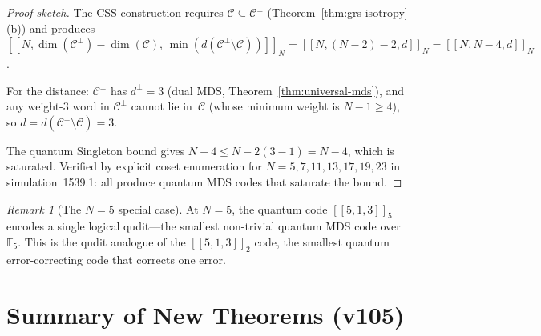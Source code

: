 \documentclass[aps,prd,twocolumn,superscriptaddress,floatfix,nofootinbib]{revtex4-2}
\theoremstyle{definition}
\theoremstyle{remark}
\newtheorem{remark}[theorem]{Remark}
\begin{document}
\begin{proof}[Proof sketch]
The CSS construction requires $\mathcal{C} \subseteq \mathcal{C}^{\perp}$
(Theorem~\ref{thm:grs-isotropy}(b)) and produces
$[\![N, \dim(\mathcal{C}^{\perp}) - \dim(\mathcal{C}),\,
\min(d(\mathcal{C}^{\perp}\setminus\mathcal{C}))]\!]_N
= [\![N, (N\!-\!2) - 2, d]\!]_N = [\![N, N\!-\!4, d]\!]_N$.

For the distance: $\mathcal{C}^{\perp}$ has $d^{\perp} = 3$
(dual MDS, Theorem~\ref{thm:universal-mds}), and any weight-$3$
word in $\mathcal{C}^{\perp}$ cannot lie in~$\mathcal{C}$
(whose minimum weight is $N - 1 \ge 4$), so
$d = d(\mathcal{C}^{\perp}\setminus\mathcal{C}) = 3$.

The quantum Singleton bound gives $N - 4 \le N - 2(3-1) = N - 4$,
which is saturated.
Verified by explicit coset enumeration for
$N = 5,7,11,13,17,19,23$ in simulation~1539.1:
all produce quantum MDS codes that saturate the bound.
\end{proof}

\begin{remark}[The $N=5$ special case]\label{rem:N5-quantum}
At $N = 5$, the quantum code $[\![5,1,3]\!]_5$ encodes a
single logical qudit---the smallest non-trivial quantum MDS
code over~$\mathbb{F}_5$.  This is the qudit analogue of the
$[\![5,1,3]\!]_2$ code, the smallest quantum error-correcting
code that corrects one error.
\end{remark}

\section*{Summary of New Theorems (v105)}
\end{document}
